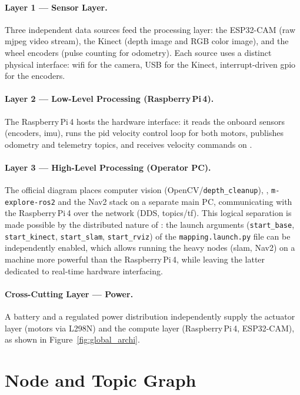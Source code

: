 \paragraph{Layer 1 --- Sensor Layer.}
Three independent data sources feed the processing layer: the ESP32-CAM (raw \gls{mjpeg}
video stream), the Kinect (depth image and RGB color image), and the wheel encoders
(pulse counting for odometry). Each source uses a distinct physical interface:
\gls{wifi} for the camera, USB for the Kinect, interrupt-driven \gls{gpio} for the
encoders.

\paragraph{Layer 2 --- Low-Level Processing (Raspberry\,Pi\,4).}
The Raspberry\,Pi\,4 hosts the \ros{} hardware interface: it reads the onboard sensors
(encoders, \gls{imu}), runs the \gls{pid} velocity control loop for both motors,
publishes odometry and telemetry topics, and receives velocity commands on
.

\paragraph{Layer 3 --- High-Level Processing (Operator PC).}
The official diagram places computer vision (OpenCV/\texttt{depth\_cleanup}),
, \texttt{m-explore-ros2} and the Nav2 stack on a separate main PC,
communicating with the Raspberry\,Pi\,4 over the \ros{} network (DDS, topics/\gls{tf}).
This logical separation is made possible by the distributed nature of \ros{}: the launch
arguments (\texttt{start\_base}, \texttt{start\_kinect}, \texttt{start\_slam},
\texttt{start\_rviz}) of the \texttt{mapping.launch.py} file can be independently
enabled, which allows running the heavy nodes (\gls{slam}, Nav2) on a machine more
powerful than the Raspberry\,Pi\,4, while leaving the latter dedicated to real-time
hardware interfacing.

\paragraph{Cross-Cutting Layer --- Power.}
A battery and a regulated power distribution independently supply the actuator layer
(motors via L298N) and the compute layer (Raspberry\,Pi\,4, ESP32-CAM), as shown in
Figure~\ref{fig:global_archi}.

\section{\ros{} Node and Topic Graph}
\label{sec:archi_nodes}

